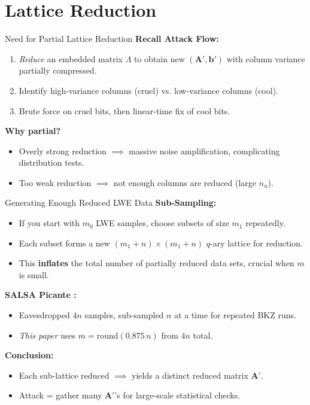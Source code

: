\documentclass{beamer}
\begin{document}
\section{Lattice Reduction}
\begin{frame}{Need for Partial Lattice Reduction}
  \textbf{Recall Attack Flow:}
  \begin{enumerate}
    \item \emph{Reduce} an embedded matrix $\Lambda$ to obtain new $(\mathbf{A}', \mathbf{b}')$ with column variance partially compressed.
    \item Identify high-variance columns (cruel) vs. low-variance columns (cool).
    \item Brute force on cruel bits, then linear-time fix of cool bits.
  \end{enumerate}

  \textbf{Why partial?}
  \begin{itemize}
    \item Overly strong reduction $\implies$ massive noise amplification, complicating distribution tests.
    \item Too weak reduction $\implies$ not enough columns are reduced (large $n_u$).
  \end{itemize}
\end{frame}

\begin{frame}{Generating Enough Reduced LWE Data}
  \textbf{Sub-Sampling:}
  \begin{itemize}
    \item If you start with $m_0$ LWE samples, choose subsets of size $m_1$ repeatedly.
    \item Each subset forms a new $(m_1 + n)\times(m_1 + n)$ $q$-ary lattice for reduction.
    \item This \textbf{inflates} the total number of partially reduced data sets, crucial when $m$ is small.
  \end{itemize}

  \vspace{0.3cm}
  \textbf{SALSA Picante \cite{SALSAref}:}
  \begin{itemize}
    \item Eavesdropped $4n$ samples, sub-sampled $n$ at a time for repeated BKZ runs.
    \item \emph{This paper} uses $m = \mathrm{round}(0.875\,n)$ from $4n$ total.
  \end{itemize}

  \vspace{0.3cm}
  \textbf{Conclusion:}
  \begin{itemize}
    \item Each sub-lattice reduced $\implies$ yields a distinct reduced matrix $\mathbf{A}'$.
    \item Attack = gather many $\mathbf{A}'$'s for large-scale statistical checks.
  \end{itemize}
\end{frame}
\end{document}
